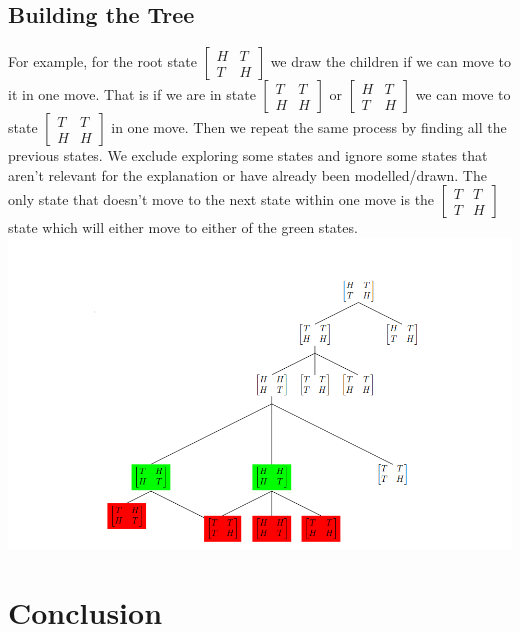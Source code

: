 \documentclass{article}
\begin{document}
\subsection{Building the Tree}
For example, for the root state {$\begin{bmatrix} H & T \\ T & H \end{bmatrix}$} we draw the children if we can move to it in one move. That is if we are in state {$\begin{bmatrix} T & T \\ H & H \end{bmatrix}$} or {$\begin{bmatrix} H & T \\ T & H \end{bmatrix}$} we can move to state {$\begin{bmatrix} T & T \\ H & H \end{bmatrix}$} in one move. Then we repeat the same process by finding all the previous states.  We exclude exploring some states and ignore some states that aren't relevant for the explanation or have already been modelled/drawn. The only state that doesn't move to the next state within one move is the {$\begin{bmatrix} T & T \\ T & H \end{bmatrix}$} state which will either move to either of the green states.
\\

\includegraphics[scale=0.5]{treelast}


\section{Conclusion}
\end{document}
